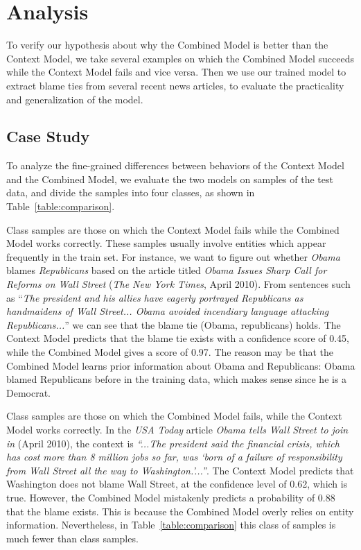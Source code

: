 \documentclass[letterpaper]{article} %
\begin{document}
\section{Analysis}

To verify our hypothesis about why the Combined Model is better than the Context Model, we take several examples on which the Combined Model succeeds while the Context Model fails and vice versa. Then we use our trained model to extract blame ties from several recent news articles, to evaluate the practicality and generalization of the model.

\subsection{Case Study}

To analyze the fine-grained differences between behaviors of the Context Model and the Combined Model, we evaluate the two models on samples of the test data, and divide the samples into four classes, as shown in Table~\ref{table:comparison}.

Class  samples are those on which the Context Model fails while the Combined Model works correctly. These samples usually involve entities which appear frequently in the train set. For instance, we want to figure out whether {\it Obama} blames {\it Republicans} based on the article titled {\it Obama Issues Sharp Call for Reforms on Wall Street} ({\it The New York Times}, April 2010). From sentences such as ``{\it The president and his allies have eagerly portrayed Republicans as handmaidens of Wall Street... Obama avoided incendiary language attacking Republicans...}'' we can see that the blame tie (Obama, republicans) holds. The Context Model predicts that the blame tie exists with a confidence score of 0.45, while the Combined Model gives a score of 0.97. The reason may be that the Combined Model learns prior information about Obama and Republicans: Obama blamed Republicans before in the training data, which makes sense since he is a Democrat.

Class  samples are those on which the Combined Model fails, while the Context Model works correctly. In the {\it USA Today} article {\it Obama tells Wall Street to join in} (April 2010), the context is {\it ``...The president said the financial crisis, which has cost more than 8 million jobs so far, was `born of a failure of responsibility from Wall Street all the way to Washington.'...''}. The Context Model predicts that Washington does not blame Wall Street, at the confidence level of 0.62, which is true. However, the Combined Model mistakenly predicts a probability of 0.88 that the blame exists. This is because the Combined Model overly relies on entity information. Nevertheless, in Table~\ref{table:comparison} this class of samples is much fewer than class  samples.
\end{document}

